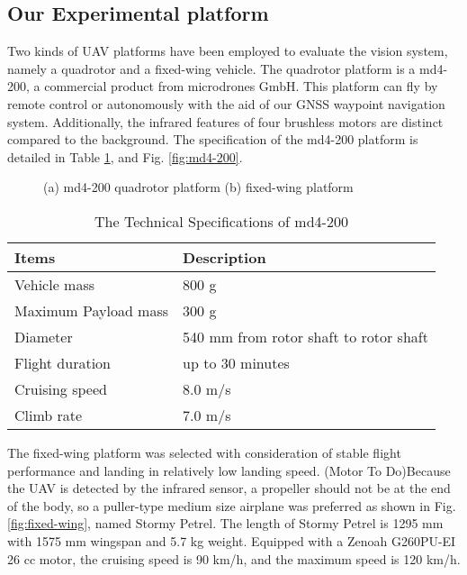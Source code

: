 \documentclass[letterpaper, 10 pt, conference]{ieeeconf}  %
\begin{document}
\subsection{Our Experimental platform}
Two kinds of UAV platforms have been employed to evaluate the vision system, namely a quadrotor and a fixed-wing vehicle. The quadrotor platform is a md4-200, a commercial product from microdrones GmbH. This platform can fly by remote control or autonomously with the aid of our GNSS waypoint navigation system. Additionally, the infrared features of four brushless motors are distinct compared to the background. The specification of the md4-200 platform is detailed in Table \ref{tab:platform_specifications}, and Fig. \ref{fig:md4-200}.
   \begin{figure}[!tb]
      \centering
      \caption{(a) md4-200 quadrotor platform (b) fixed-wing platform}
   \end{figure}
   
  \begin{table}[!tb]
  \caption{The Technical Specifications of md4-200}
  \label{tab:platform_specifications}
  \begin{center}
  \renewcommand{\arraystretch}{1.1}
    \begin{tabular}{ll}
    \hline
    \textbf {Items}  & \textbf{Description} \\
    \hline
    Vehicle mass & 800 g \\
    Maximum Payload mass &	300 g \\
    Diameter & 540 mm from rotor shaft to rotor shaft \\
    Flight duration & up to 30 minutes \\
    Cruising speed & 8.0 m/s \\
    Climb rate & 7.0 m/s \\
    \hline
    \end{tabular}
  \end{center}
  \end{table}
The fixed-wing platform was selected with consideration of stable flight performance and landing in relatively low landing speed. (Motor To Do)Because the UAV is detected by the infrared sensor, a propeller should not be at the end of the body, so a puller-type medium size airplane was preferred as shown in Fig. \ref{fig:fixed-wing}, named Stormy Petrel. The length of Stormy Petrel is 1295 mm with 1575 mm wingspan and 5.7 kg weight. Equipped with a Zenoah G260PU-EI 26 cc motor, the cruising speed is 90 km/h, and the maximum speed is 120 km/h.
\end{document}
